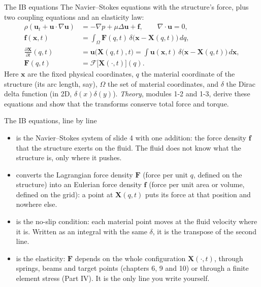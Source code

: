 \documentclass[aspectratio=169,11pt]{beamer}
\begin{document}
\begin{frame}{The IB equations}
The Navier--Stokes equations with the structure's force, plus two coupling equations and an elasticity law:
\begin{align*}
\rho\left(\mathbf{u}_t + \mathbf{u}\cdot\nabla\mathbf{u}\right) &= -\nabla p + \mu\Delta\mathbf{u} + \mathbf{f}, \qquad \nabla\cdot\mathbf{u} = 0,\\
\mathbf{f}(\mathbf{x},t) &= \int_\Omega \mathbf{F}(q,t)\,\delta\big(\mathbf{x} - \mathbf{X}(q,t)\big)\,dq, \\
\frac{\partial \mathbf{X}}{\partial t}(q,t) &= \mathbf{u}\big(\mathbf{X}(q,t),t\big) = \int \mathbf{u}(\mathbf{x},t)\,\delta\big(\mathbf{x}-\mathbf{X}(q,t)\big)\,d\mathbf{x}, \\
\mathbf{F}(q,t) &= \mathcal{F}\big[\mathbf{X}(\cdot,t)\big](q) .
\end{align*}
\small Here $\mathbf{x}$ are the fixed physical coordinates, $q$ the material coordinate of the structure (its arc length, say), $\Omega$ the set of material coordinates, and $\delta$ the Dirac delta function (in 2D, $\delta(x)\delta(y)$). \emph{Theory}, modules 1-2 and 1-3, derive these equations and show that the transforms conserve total force and torque.
\end{frame}

\begin{frame}{The IB equations, line by line}
\begin{itemize}
  \item {} is the Navier--Stokes system of slide 4 with one addition: the force density $\mathbf{f}$ that the structure exerts on the fluid. The fluid does not know what the structure is, only where it pushes.
  \item {} converts the Lagrangian force density $\mathbf{F}$ (force per unit $q$, defined on the structure) into an Eulerian force density $\mathbf{f}$ (force per unit area or volume, defined on the grid): a point at $\mathbf{X}(q,t)$ puts its force at that position and nowhere else.
  \item {} is the no-slip condition: each material point moves at the fluid velocity where it is. Written as an integral with the same $\delta$, it is the transpose of the second line.
  \item {} is the elasticity: $\mathbf{F}$ depends on the whole configuration $\mathbf{X}(\cdot,t)$, through springs, beams and target points (chapters 6, 9 and 10) or through a finite element stress (Part IV). It is the only line you write yourself.
\end{itemize}
\end{frame}
\end{document}
